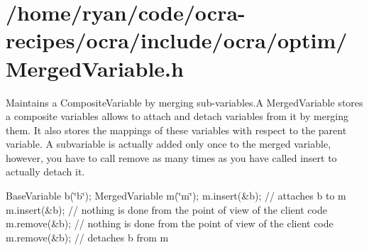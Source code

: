 \hypertarget{_2home_2ryan_2code_2ocra-recipes_2ocra_2include_2ocra_2optim_2MergedVariable_8h-example}{}\section{/home/ryan/code/ocra-\/recipes/ocra/include/ocra/optim/\+Merged\+Variable.\+h}
Maintains a Composite\+Variable by merging sub-\/variables.\+A Merged\+Variable stores a composite variables allows to attach and detach variables from it by merging them. It also stores the mappings of these variables with respect to the parent variable. A subvariable is actually added only once to the merged variable, however, you have to call \textquotesingle{}remove\textquotesingle{} as many times as you have called \textquotesingle{}insert\textquotesingle{} to actually detach it.

Base\+Variable b(\char`\"{}b\char`\"{}); Merged\+Variable m(\char`\"{}m\char`\"{}); m.\+insert(\&b); // attaches b to m m.\+insert(\&b); // nothing is done from the point of view of the client code m.\+remove(\&b); // nothing is done from the point of view of the client code m.\+remove(\&b); // detaches b from m


